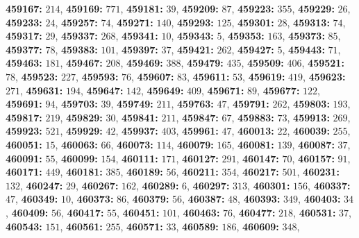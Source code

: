\textsf{\bfseries 459167:} $214$, \textsf{\bfseries 459169:} $771$, \textsf{\bfseries 459181:} $39$, \textsf{\bfseries 459209:} $87$, \textsf{\bfseries 459223:} $355$, \textsf{\bfseries 459229:} $26$, \textsf{\bfseries 459233:} $24$, \textsf{\bfseries 459257:} $74$, \textsf{\bfseries 459271:} $140$, \textsf{\bfseries 459293:} $125$, \textsf{\bfseries 459301:} $28$, \textsf{\bfseries 459313:} $74$, \textsf{\bfseries 459317:} $29$, \textsf{\bfseries 459337:} $268$, \textsf{\bfseries 459341:} $10$, \textsf{\bfseries 459343:} $5$, \textsf{\bfseries 459353:} $163$, \textsf{\bfseries 459373:} $85$, \textsf{\bfseries 459377:} $78$, \textsf{\bfseries 459383:} $101$, \textsf{\bfseries 459397:} $37$, \textsf{\bfseries 459421:} $262$, \textsf{\bfseries 459427:} $5$, \textsf{\bfseries 459443:} $71$, \textsf{\bfseries 459463:} $181$, \textsf{\bfseries 459467:} $208$, \textsf{\bfseries 459469:} $388$, \textsf{\bfseries 459479:} $435$, \textsf{\bfseries 459509:} $406$, \textsf{\bfseries 459521:} $78$, \textsf{\bfseries 459523:} $227$, \textsf{\bfseries 459593:} $76$, \textsf{\bfseries 459607:} $83$, \textsf{\bfseries 459611:} $53$, \textsf{\bfseries 459619:} $419$, \textsf{\bfseries 459623:} $271$, \textsf{\bfseries 459631:} $194$, \textsf{\bfseries 459647:} $142$, \textsf{\bfseries 459649:} $409$, \textsf{\bfseries 459671:} $89$, \textsf{\bfseries 459677:} $122$, \textsf{\bfseries 459691:} $94$, \textsf{\bfseries 459703:} $39$, \textsf{\bfseries 459749:} $211$, \textsf{\bfseries 459763:} $47$, \textsf{\bfseries 459791:} $262$, \textsf{\bfseries 459803:} $193$, \textsf{\bfseries 459817:} $219$, \textsf{\bfseries 459829:} $30$, \textsf{\bfseries 459841:} $211$, \textsf{\bfseries 459847:} $67$, \textsf{\bfseries 459883:} $73$, \textsf{\bfseries 459913:} $269$, \textsf{\bfseries 459923:} $521$, \textsf{\bfseries 459929:} $42$, \textsf{\bfseries 459937:} $403$, \textsf{\bfseries 459961:} $47$, \textsf{\bfseries 460013:} $22$, \textsf{\bfseries 460039:} $255$, \textsf{\bfseries 460051:} $15$, \textsf{\bfseries 460063:} $66$, \textsf{\bfseries 460073:} $114$, \textsf{\bfseries 460079:} $165$, \textsf{\bfseries 460081:} $139$, \textsf{\bfseries 460087:} $37$, \textsf{\bfseries 460091:} $55$, \textsf{\bfseries 460099:} $154$, \textsf{\bfseries 460111:} $171$, \textsf{\bfseries 460127:} $291$, \textsf{\bfseries 460147:} $70$, \textsf{\bfseries 460157:} $91$, \textsf{\bfseries 460171:} $449$, \textsf{\bfseries 460181:} $385$, \textsf{\bfseries 460189:} $56$, \textsf{\bfseries 460211:} $354$, \textsf{\bfseries 460217:} $501$, \textsf{\bfseries 460231:} $132$, \textsf{\bfseries 460247:} $29$, \textsf{\bfseries 460267:} $162$, \textsf{\bfseries 460289:} $6$, \textsf{\bfseries 460297:} $313$, \textsf{\bfseries 460301:} $156$, \textsf{\bfseries 460337:} $47$, \textsf{\bfseries 460349:} $10$, \textsf{\bfseries 460373:} $86$, \textsf{\bfseries 460379:} $56$, \textsf{\bfseries 460387:} $48$, \textsf{\bfseries 460393:} $349$, \textsf{\bfseries 460403:} $34$, \textsf{\bfseries 460409:} $56$, \textsf{\bfseries 460417:} $55$, \textsf{\bfseries 460451:} $101$, \textsf{\bfseries 460463:} $76$, \textsf{\bfseries 460477:} $218$, \textsf{\bfseries 460531:} $37$, \textsf{\bfseries 460543:} $151$, \textsf{\bfseries 460561:} $255$, \textsf{\bfseries 460571:} $33$, \textsf{\bfseries 460589:} $186$, \textsf{\bfseries 460609:} $348$, 
